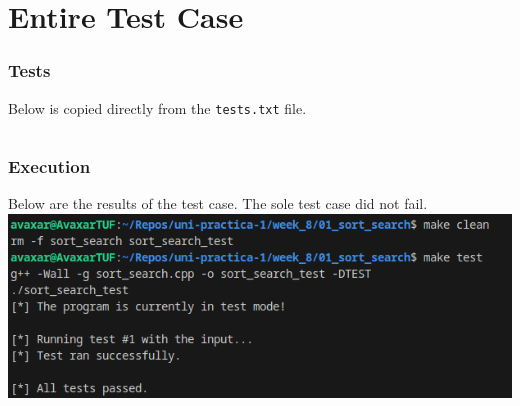 \documentclass[12pt]{article}
\begin{document}
\section{Entire Test Case}

\subsubsection{Tests}
Below is copied directly from the \texttt{tests.txt} file.
\inputminted{text}{01_sort_search/tests.txt}

\subsubsection{Execution}
Below are the results of the test case. The sole test case did not fail.
\newline\includegraphics[width=\textwidth]{01_sort_search_test}
\end{document}
